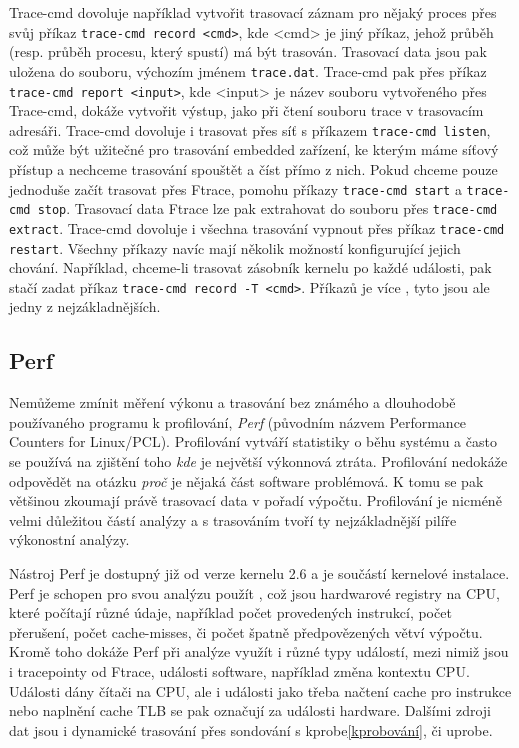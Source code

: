Trace-cmd dovoluje například vytvořit trasovací záznam pro nějaký proces přes svůj příkaz \texttt{trace-cmd~record~<cmd>}, kde <cmd> je jiný příkaz, jehož průběh (resp. průběh procesu, který spustí) má být trasován. Trasovací data jsou pak uložena do souboru, výchozím jménem \texttt{trace.dat}. Trace-cmd pak přes příkaz \texttt{trace-cmd report <input>}, kde <input> je název souboru vytvořeného přes Trace-cmd, dokáže vytvořit výstup, jako při čtení souboru trace v trasovacím adresáři. Trace-cmd dovoluje i trasovat přes síť s příkazem \texttt{trace-cmd listen}, což může být užitečné pro trasování embedded zařízení, ke kterým máme síťový přístup a nechceme trasování spouštět a číst přímo z nich. Pokud chceme pouze jednoduše začít trasovat přes Ftrace, pomohu příkazy \texttt{trace-cmd start} a \texttt{trace-cmd stop}. Trasovací data Ftrace lze pak extrahovat do souboru přes \texttt{trace-cmd extract}. Trace-cmd dovoluje i všechna trasování vypnout přes příkaz \texttt{trace-cmd restart}. Všechny příkazy navíc mají několik možností konfigurující jejich chování. Například, chceme-li trasovat zásobník kernelu po každé události, pak stačí zadat příkaz \texttt{trace-cmd record -T <cmd>}. Příkazů je více \cite{Trace-cmd-Man}, tyto jsou ale jedny z nejzákladnějších.

\subsection{Perf}
\label{Perf}

Nemůžeme zmínit měření výkonu a trasování bez známého a dlouhodobě používaného programu k profilování, \emph{Perf} \cite{Perf-Wiki} (původním názvem Performance Counters for Linux/PCL). Profilování vytváří statistiky o běhu systému a často se používá na zjištění toho \emph{kde} je největší výkonnová ztráta. Profilování nedokáže odpovědět na otázku \emph{proč} je nějaká část software problémová. K tomu se pak většinou zkoumají právě trasovací data v pořadí výpočtu. Profilování je nicméně velmi důležitou částí analýzy a s trasováním tvoří ty nejzákladnější pilíře výkonostní analýzy.

Nástroj Perf je dostupný již od verze kernelu 2.6 a je součástí kernelové instalace. Perf je schopen pro svou analýzu použít , což jsou hardwarové registry na CPU, které počítají různé údaje, například počet provedených instrukcí, počet přerušení, počet cache-misses, či počet špatně předpovězených větví výpočtu. Kromě toho dokáže Perf při analýze využít i různé typy událostí, mezi nimiž jsou i tracepointy od Ftrace, události software, například změna kontextu CPU. Události dány čítači na CPU, ale i události jako třeba načtení cache pro instrukce nebo naplnění cache TLB se pak označují za události hardware. Dalšími zdroji dat jsou i dynamické trasování přes sondování s kprobe\ref{kprobování}, či uprobe.

